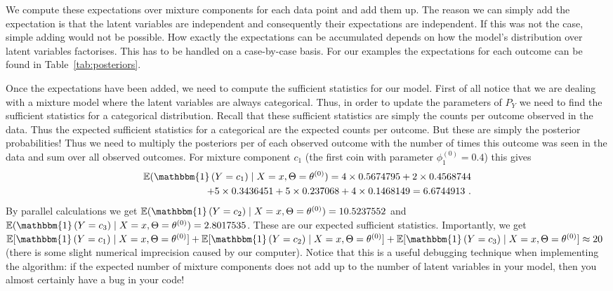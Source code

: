 \documentclass[a4paper,11pt,leqno]{report}\usepackage[]{graphicx}\usepackage[]{color}
\newcommand{\E}{\mathbb{E}}
\newcommand{\id}[1]{\mathbbm{1}\left(#1\right)}
\begin{document}
We compute these expectations over mixture components for each data point and add them up. The reason we can simply add the expectation is that
the latent variables are independent and consequently their expectations are independent. If this was not the case, simple adding would not
be possible. How exactly the expectations can be accumulated depends on how the model's distribution over latent variables factorises. This has to
be handled on a case-by-case basis. For our examples the expectations for each outcome can be found in Table~\ref{tab:posteriors}.

Once the expectations have been added, we need to compute the sufficient statistics for our model. First of all notice that we are dealing with
a mixture model where the latent variables are always categorical. Thus, in order to update the parameters of $ P_{Y} $ we need to find the
sufficient statistics for a categorical distribution. Recall that these sufficient statistics are simply the counts per outcome observed in
the data. Thus the expected sufficient statistics for a categorical are the expected counts per outcome. But these are simply the posterior
probabilities! Thus we need to multiply the posteriors per of each observed outcome with the number of times this outcome was
seen in the data and sum over all observed outcomes. For mixture component $ c_{1} $ (the first coin with parameter $ \phi^{(0)}_{1} = 0.4 $) this gives
\begin{align}
\E(\id{Y = c_{1}} \mid X=x,\Theta= \theta^{(0)}) = 4 \times 0.5674795 + 2 \times 0.4568744 \label{eq:c1Expectation} \\ 
+ 5 \times 0.3436451 + 5 \times 0.237068 + 4 \times 0.1468149 = 6.6744913 \nonumber \ .
\end{align}
By parallel calculations we get $ \E(\id{Y = c_{2}}\mid X=x,\Theta= \theta^{(0)}) = 10.5237552 $ and $ \E(\id{Y = c_{3}}\mid X=x,\Theta= 
\theta^{(0)}) = 2.8017535 $. 
These are our expected sufficient statistics. Importantly, we get 
$ \E[\id{Y = c_{1}}\mid X=x,\Theta= \theta^{(0)}] + \E[\id{Y = c_{2}}\mid X=x,\Theta= \theta^{(0)}] + \E[\id{Y = c_{3}}\mid X=x,\Theta= \theta^{(0)}] \approx 20 $ (there is some slight numerical imprecision
caused by our computer). Notice that this is a useful debugging technique when implementing the algorithm: if the expected number of mixture components
does not add up to the number of latent variables in your model, then you almost certainly have a bug in your code!
\end{document}
